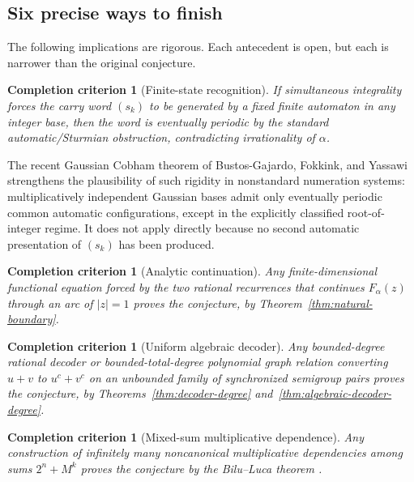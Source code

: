 \documentclass[11pt,oneside]{article}
\newtheorem{criterion}[theorem]{Completion criterion}
\theoremstyle{definition}
\theoremstyle{remark}
\newcommand{\abs}[1]{\left|#1\right|}
\begin{document}
\subsection{Six precise ways to finish}

The following implications are rigorous.  Each antecedent is open, but each is narrower than the original conjecture.

\begin{criterion}[Finite-state recognition]\label{crit:finite-state}
If simultaneous integrality forces the carry word \((s_k)\) to be generated by a fixed finite automaton in any integer base, then the word is eventually periodic by the standard automatic/Sturmian obstruction, contradicting irrationality of \(\alpha\).
\end{criterion}

The recent Gaussian Cobham theorem of Bustos-Gajardo, Fokkink, and Yassawi \cite{BustosFokkinkYassawi2026} strengthens the plausibility of such rigidity in nonstandard numeration systems: multiplicatively independent Gaussian bases admit only eventually periodic common automatic configurations, except in the explicitly classified root-of-integer regime.  It does not apply directly because no second automatic presentation of \((s_k)\) has been produced.

\begin{criterion}[Analytic continuation]\label{crit:analytic-restated}
Any finite-dimensional functional equation forced by the two rational recurrences that continues \(F_\alpha(z)\) through an arc of \(\abs z=1\) proves the conjecture, by Theorem~\ref{thm:natural-boundary}.
\end{criterion}

\begin{criterion}[Uniform algebraic decoder]\label{crit:uniform-decoder}
Any bounded-degree rational decoder or bounded-total-degree polynomial graph relation converting \(u+v\) to \(u^c+v^c\) on an unbounded family of synchronized semigroup pairs proves the conjecture, by Theorems~\ref{thm:decoder-degree} and~\ref{thm:algebraic-decoder-degree}.
\end{criterion}

\begin{criterion}[Mixed-sum multiplicative dependence]\label{crit:mixed-sum}
Any construction of infinitely many noncanonical multiplicative dependencies among sums \(2^n+M^k\) proves the conjecture by the Bilu--Luca theorem \cite{BiluLuca2026}.
\end{criterion}
\end{document}
